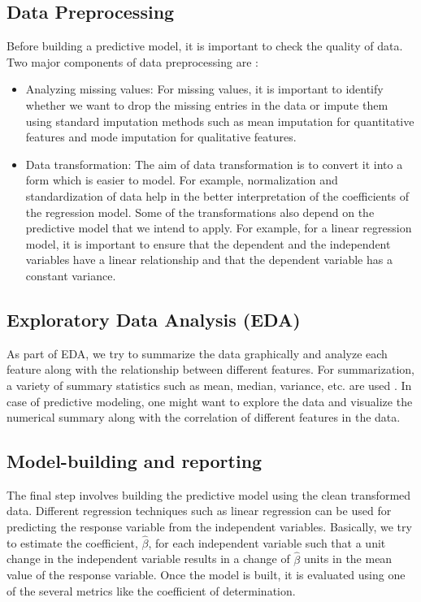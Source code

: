 \documentclass[sigconf]{acmart}
\begin{document}
\subsection{Data Preprocessing} 
Before building a predictive model, it is important to check the quality of data. Two major components of data preprocessing are \cite{part-reg}:
\begin{itemize}
	\item Analyzing missing values: For missing values, it is important to identify whether we want to drop the missing entries in the data or impute them using standard imputation methods such as mean imputation for quantitative features and mode imputation for qualitative features.
	\item Data transformation: The aim of data transformation is to convert it into a form which is easier to model. For example, normalization and standardization of data help in the better interpretation of the coefficients of the regression model. Some of the transformations also depend on the predictive model that we intend to apply. For example, for a linear regression model, it is important to ensure that the dependent and the independent variables have a linear relationship and that the dependent variable has a constant variance.
\end{itemize}
\subsection{Exploratory Data Analysis (EDA)} 
As part of EDA, we try to summarize the data graphically and analyze each feature along with the relationship between different features. For summarization, a variety of summary statistics such as mean, median, variance, etc. are used \cite{part-reg}. In case of predictive modeling, one might want to explore the data and visualize the numerical summary along with the correlation of different features in the data.
\subsection{Model-building and reporting}
The final step involves building the predictive model using the clean transformed data. Different regression techniques such as linear regression can be used for predicting the response variable from the independent variables. Basically, we try to estimate the coefficient, $\hat{\beta}$, for each independent variable such that a unit change in the independent variable results in a change of $\hat{\beta}$ units in the mean value of the response variable. Once the model is built, it is evaluated using one of the several metrics like the coefficient of determination.
\end{document}
